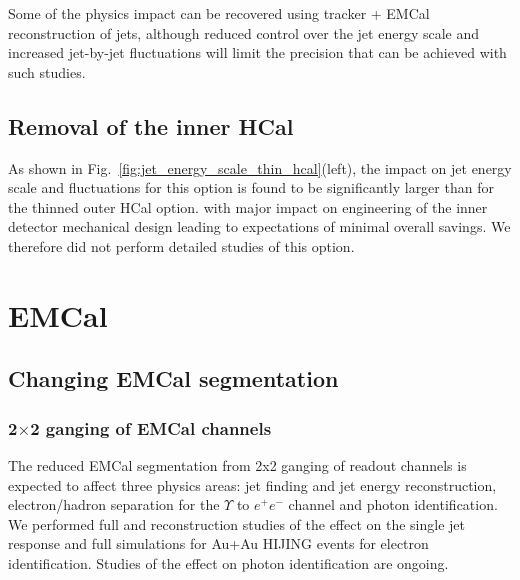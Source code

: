 Some of the physics impact can be recovered using tracker + EMCal reconstruction of jets, although reduced control over the jet 
energy scale and increased jet-by-jet fluctuations will limit the precision that can be achieved with such studies.

\subsection{Removal of the inner HCal}

As shown in Fig.~\ref{fig:jet_energy_scale_thin_hcal}(left), the impact on jet energy scale and fluctuations for this option is 
found to be significantly larger than for the thinned outer HCal option. 
with major impact on engineering of the inner detector mechanical design leading to expectations of minimal overall savings.
We therefore did not perform detailed studies of this option.

\section{EMCal}
\subsection{Changing EMCal segmentation}
\subsubsection{2$\times$2 ganging of EMCal channels}
The reduced EMCal segmentation from 2x2 ganging of readout channels is expected to affect three physics areas: jet finding 
and jet energy reconstruction, electron/hadron separation for the $\Upsilon$ to $e^+ e^-$ channel and photon identification.
We performed full \geant and reconstruction studies of the effect on the single jet response and full \geant simulations for 
Au+Au HIJING events for electron identification. Studies of the effect on photon identification are ongoing.

